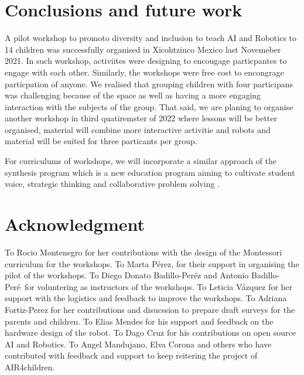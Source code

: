\documentclass[conference]{IEEEtran}
\begin{document}
\section{Conclusions and future work}
A pilot workshop to promoto diversity and inclusion to teach AI and Robotics to 14 children was successfully organised in Xicohtzinco Mexico last Novemeber 2021.
In such workshop, activiites were designing to encougage particpantes to engage with each other. 
Similarly, the workshops were free cost to encongrage particpation of anyone. 
We realised that grouping children with four participans was challenging because of the space as well as having a more engaging interaction with the subjects of the group. 
That said, we are planing to organise another workshop in third quatiremster of 2022 where lessons will be better organised, material will combine more interactive activitie and robots and material will be suited for three particants per group. 

For curriculums of workshops, we will incorporate a similar approach of the synthesis program which is a new education program aiming to cultivate student voice, strategic thinking and collaborative problem solving \cite{synthesis2022}.


\section*{Acknowledgment}
To Rocio Montenegro for her contributions with the design of the Montessori curriculum for the workshops.
To Marta P\'erez, for their support in organising the pilot of the workshops.
To Diego Donato Badillo-Per\'ez and Antonio Badillo-Per\'e\ for voluntering as instructors of the workshops.
To Leticia V\'azquez for her support with the logistics and feedback to improve the workshops.
To Adriana Fortiz-Perez for her contributions and disucssion to prepare draft surveys for the parents and children. 
To Elias Mendes for his support and feedback on the hardware design of the robot.
To Dago Cruz for his contributions on open source AI and Robotics.
To Angel Mandujano, Elva Corona and others who have contributed with feedback and support to keep reitering the project of AIR4children. 



\end{document}
